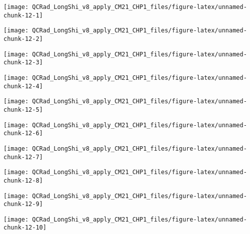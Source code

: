 \documentclass[
  10pt,
  a4paper,oneside]{article}
\begin{document}
\begin{center}\texttt{[image: QCRad\_LongShi\_v8\_apply\_CM21\_CHP1\_files/figure-latex/unnamed-chunk-12-1]} \end{center}

\begin{center}\texttt{[image: QCRad\_LongShi\_v8\_apply\_CM21\_CHP1\_files/figure-latex/unnamed-chunk-12-2]} \end{center}

\begin{center}\texttt{[image: QCRad\_LongShi\_v8\_apply\_CM21\_CHP1\_files/figure-latex/unnamed-chunk-12-3]} \end{center}

\begin{center}\texttt{[image: QCRad\_LongShi\_v8\_apply\_CM21\_CHP1\_files/figure-latex/unnamed-chunk-12-4]} \end{center}

\begin{center}\texttt{[image: QCRad\_LongShi\_v8\_apply\_CM21\_CHP1\_files/figure-latex/unnamed-chunk-12-5]} \end{center}

\begin{center}\texttt{[image: QCRad\_LongShi\_v8\_apply\_CM21\_CHP1\_files/figure-latex/unnamed-chunk-12-6]} \end{center}

\begin{center}\texttt{[image: QCRad\_LongShi\_v8\_apply\_CM21\_CHP1\_files/figure-latex/unnamed-chunk-12-7]} \end{center}

\begin{center}\texttt{[image: QCRad\_LongShi\_v8\_apply\_CM21\_CHP1\_files/figure-latex/unnamed-chunk-12-8]} \end{center}

\begin{center}\texttt{[image: QCRad\_LongShi\_v8\_apply\_CM21\_CHP1\_files/figure-latex/unnamed-chunk-12-9]} \end{center}

\begin{center}\texttt{[image: QCRad\_LongShi\_v8\_apply\_CM21\_CHP1\_files/figure-latex/unnamed-chunk-12-10]} \end{center}
\end{document}
